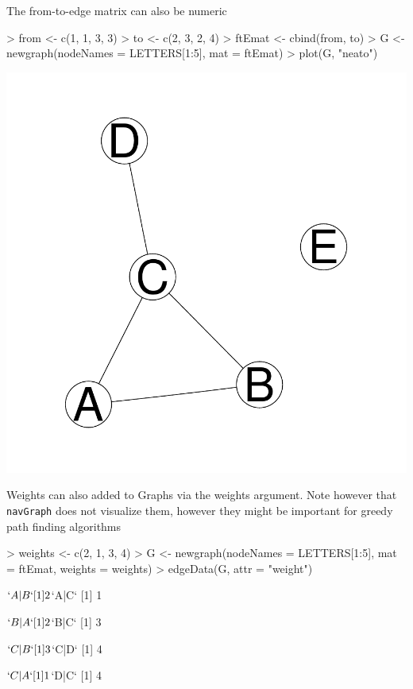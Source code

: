 \documentclass[12pt,oneside,titlepage,letter]{article}
\begin{document}
The from-to-edge matrix can also be numeric
\begin{center}
\begin{Schunk}
\begin{Sinput}
> from <- c(1, 1, 3, 3)
> to <- c(2, 3, 2, 4)
> ftEmat <- cbind(from, to)
> G <- newgraph(nodeNames = LETTERS[1:5], mat = ftEmat)
> plot(G, "neato")
\end{Sinput}
\end{Schunk}
\includegraphics{sweave_p-035}
\end{center}

Weights can also added to Graphs via the weights argument. Note however that \texttt{navGraph} does not visualize them, however they might be important for greedy path finding algorithms
\begin{Schunk}
\begin{Sinput}
> weights <- c(2, 1, 3, 4)
> G <- newgraph(nodeNames = LETTERS[1:5], mat = ftEmat, weights = weights)
> edgeData(G, attr = "weight")
\end{Sinput}
\begin{Soutput}
$`A|B`
[1] 2

$`A|C`
[1] 1

$`B|A`
[1] 2

$`B|C`
[1] 3

$`C|B`
[1] 3

$`C|D`
[1] 4

$`C|A`
[1] 1

$`D|C`
[1] 4
\end{Soutput}
\end{Schunk}
\end{document}

